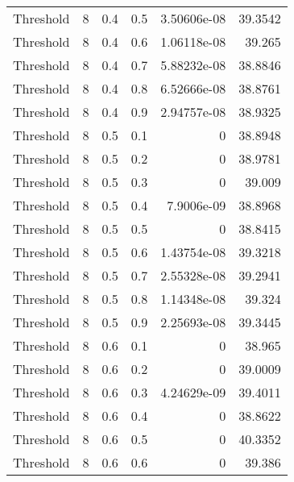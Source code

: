 \documentclass{article}
\begin{document}
\begin{longtable}[H]{lrrrrr}
 Threshold      &       8 &   0.4 &            0.5 &      3.50606e-08 &         39.3542 \\
 Threshold      &       8 &   0.4 &            0.6 &      1.06118e-08 &         39.265  \\
 Threshold      &       8 &   0.4 &            0.7 &      5.88232e-08 &         38.8846 \\
 Threshold      &       8 &   0.4 &            0.8 &      6.52666e-08 &         38.8761 \\
 Threshold      &       8 &   0.4 &            0.9 &      2.94757e-08 &         38.9325 \\
 Threshold      &       8 &   0.5 &            0.1 &      0           &         38.8948 \\
 Threshold      &       8 &   0.5 &            0.2 &      0           &         38.9781 \\
 Threshold      &       8 &   0.5 &            0.3 &      0           &         39.009  \\
 Threshold      &       8 &   0.5 &            0.4 &      7.9006e-09  &         38.8968 \\
 Threshold      &       8 &   0.5 &            0.5 &      0           &         38.8415 \\
 Threshold      &       8 &   0.5 &            0.6 &      1.43754e-08 &         39.3218 \\
 Threshold      &       8 &   0.5 &            0.7 &      2.55328e-08 &         39.2941 \\
 Threshold      &       8 &   0.5 &            0.8 &      1.14348e-08 &         39.324  \\
 Threshold      &       8 &   0.5 &            0.9 &      2.25693e-08 &         39.3445 \\
 Threshold      &       8 &   0.6 &            0.1 &      0           &         38.965  \\
 Threshold      &       8 &   0.6 &            0.2 &      0           &         39.0009 \\
 Threshold      &       8 &   0.6 &            0.3 &      4.24629e-09 &         39.4011 \\
 Threshold      &       8 &   0.6 &            0.4 &      0           &         38.8622 \\
 Threshold      &       8 &   0.6 &            0.5 &      0           &         40.3352 \\
 Threshold      &       8 &   0.6 &            0.6 &      0           &         39.386  \\

\end{longtable}
\end{document}
